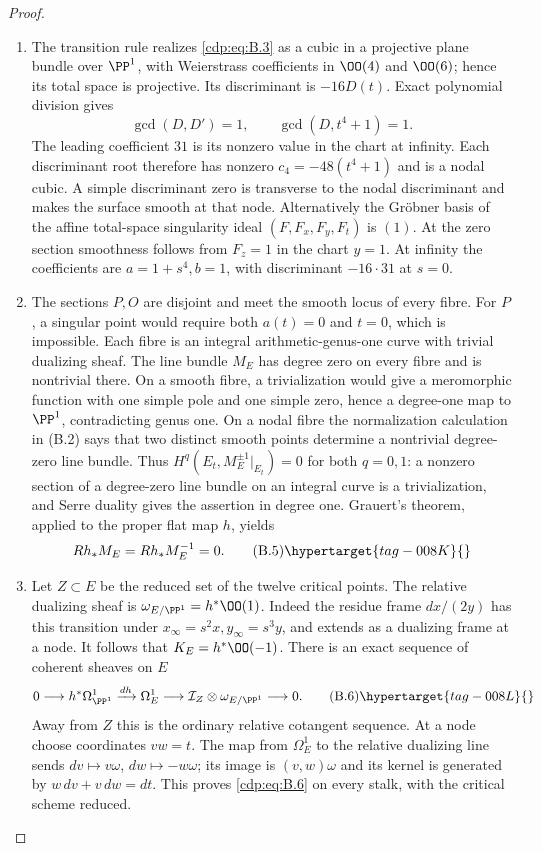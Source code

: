 \begin{proof}

\begin{enumerate}[label={$\langle1\rangle$\arabic*.},leftmargin=*]
\item The transition rule realizes \eqref{cdp:eq:B.3} as a cubic in a projective plane bundle over $\PP^1$, with Weierstrass coefficients in $\OO(4)$ and $\OO(6)$; hence its total space is projective. Its discriminant is $-16D(t)$. Exact polynomial division gives
\[
 \gcd(D,D')=1,\qquad \gcd(D,t^4+1)=1.
\]
The leading coefficient $31$ is its nonzero value in the chart at infinity. Each discriminant root therefore has nonzero $c_4=-48(t^4+1)$ and is a nodal cubic. A simple discriminant zero is transverse to the nodal discriminant and makes the surface smooth at that node. Alternatively the Gr\"obner basis of the affine total-space singularity ideal $(F,F_x,F_y,F_t)$ is $(1)$. At the zero section smoothness follows from $F_z=1$ in the chart $y=1$. At infinity the coefficients are $a=1+s^4,b=1$, with discriminant $-16\cdot31$ at $s=0$.

\item The sections $P,O$ are disjoint and meet the smooth locus of every fibre. For $P$, a singular point would require both $a(t)=0$ and $t=0$, which is impossible. Each fibre is an integral arithmetic-genus-one curve with trivial dualizing sheaf. The line bundle $M_E$ has degree zero on every fibre and is nontrivial there. On a smooth fibre, a trivialization would give a meromorphic function with one simple pole and one simple zero, hence a degree-one map to $\PP^1$, contradicting genus one. On a nodal fibre the normalization calculation in (B.2) says that two distinct smooth points determine a nontrivial degree-zero line bundle. Thus $H^q(E_t,M_E^{\pm1}|_{E_t})=0$ for both $q=0,1$: a nonzero section of a degree-zero line bundle on an integral curve is a trivialization, and Serre duality gives the assertion in degree one. Grauert's theorem, applied to the proper flat map $h$, yields
\[
 Rh_*M_E=Rh_*M_E^{-1}=0.                               \tag{B.5}\hypertarget{tag-008K}{}\label{cdp:eq:B.5}
\]

\item Let $Z\subset E$ be the reduced set of the twelve critical points. The relative dualizing sheaf is $\omega_{E/\PP^1}=h^*\OO(1)$. Indeed the residue frame $dx/(2y)$ has this transition under $x_\infty=s^2x,y_\infty=s^3y$, and extends as a dualizing frame at a node. It follows that $K_E=h^*\OO(-1)$. There is an exact sequence of coherent sheaves on $E$
\[
0\longrightarrow h^*\Omega^1_{\PP^1}
 \xrightarrow{dh}\Omega^1_E
 \longrightarrow\mathcal I_Z\otimes\omega_{E/\PP^1}
 \longrightarrow0.                                   \tag{B.6}\hypertarget{tag-008L}{}\label{cdp:eq:B.6}
\]
Away from $Z$ this is the ordinary relative cotangent sequence. At a node choose coordinates $vw=t$. The map from $\Omega^1_E$ to the relative dualizing line sends $dv\mapsto v\omega$, $dw\mapsto-w\omega$; its image is $(v,w)\omega$ and its kernel is generated by $w\,dv+v\,dw=dt$. This proves \eqref{cdp:eq:B.6} on every stalk, with the critical scheme reduced.


\end{enumerate}
\end{proof}
